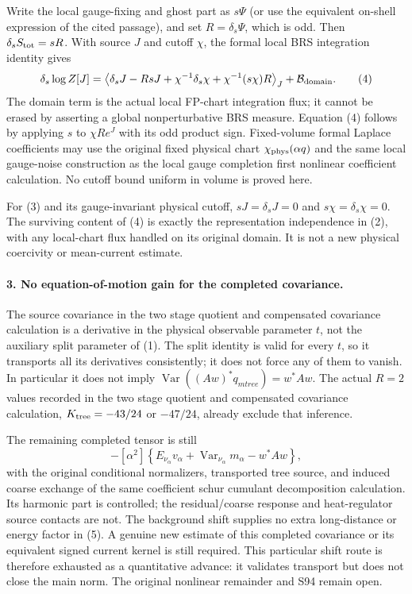 \documentclass[11pt]{article}
\begin{document}
Write the local gauge-fixing and ghost part as $s\Psi$ (or use the
equivalent on-shell expression of the cited passage), and set
$R=\delta_s\Psi$, which is odd. Then
$\delta_sS_{\rm tot}=sR$. With source $J$ and cutoff $\chi$,
the formal local BRS integration identity gives
\[
 \delta_s\log Z[J]=
 \left\langle\delta_sJ-RsJ
       +\chi^{-1}\delta_s\chi+\chi^{-1}(s\chi)R\right\rangle_J
       +{\cal B}_{\rm domain}. \tag{4}
\]
The domain term is the actual local FP-chart integration flux; it
cannot be erased by asserting a global nonperturbative BRS measure.
Equation (4) follows by applying $s$ to $\chi R e^J$ with its odd
product sign. Fixed-volume formal Laplace coefficients may use the
original fixed physical chart $\chi_{\rm phys}(\alpha q)$ and the
same local gauge-noise construction as the local gauge completion first nonlinear coefficient calculation. No cutoff bound uniform
in volume is proved here.

For (3) and its gauge-invariant physical cutoff, $sJ=\delta_sJ=0$
and $s\chi=\delta_s\chi=0$. The surviving content of (4) is exactly
the representation independence in (2), with any local-chart flux
handled on its original domain. It is not a new physical coercivity
or mean-current estimate.

\paragraph{3. No equation-of-motion gain for the completed covariance.}
The source covariance in the two stage quotient and compensated covariance calculation is a derivative in the physical observable
parameter $t$, not the auxiliary split parameter of (1).
The split identity is valid for every $t$, so it transports all its
derivatives consistently; it does not force any of them to vanish.
In particular it does not imply
$\operatorname{Var}((Aw)^*q_{
m tree})=w^*Aw$.
The actual $R=2$ values recorded in the two stage quotient and compensated covariance calculation,
$K_{\rm tree}=-43/24$ or $-47/24$, already exclude that inference.

The remaining completed tensor is still
\[
 -[\alpha^2]\left\{E_{\nu_\alpha}v_\alpha
       +\operatorname{Var}_{\nu_\alpha}m_\alpha-w^*Aw\right\}, \tag{5}
\]
with the original conditional normalizers, transported tree source,
and induced coarse exchange of the same coefficient schur cumulant decomposition calculation. Its harmonic part is controlled;
the residual/coarse response and heat-regulator source contacts are
not. The background shift supplies no extra long-distance or energy
factor in (5). A genuine new estimate of this completed covariance
or its equivalent signed current kernel is still required.
This particular shift route is therefore exhausted as a quantitative
advance: it validates transport but does not close the main norm.
The original nonlinear remainder and S94 remain open.
\end{document}

